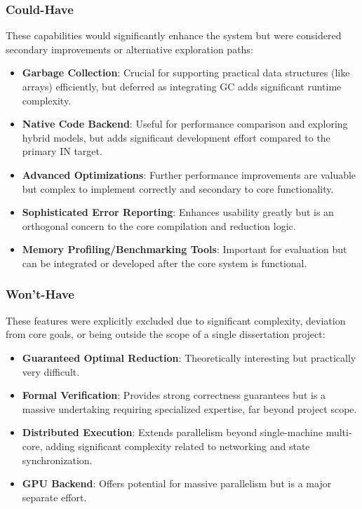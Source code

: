 \subsubsection*{Could-Have}
These capabilities would significantly enhance the system but were considered secondary improvements or alternative exploration paths:
\begin{itemize}
    \item \textbf{Garbage Collection}: Crucial for supporting practical data structures (like arrays) efficiently, but deferred as integrating GC adds significant runtime complexity.
    \item \textbf{Native Code Backend}: Useful for performance comparison and exploring hybrid models, but adds significant development effort compared to the primary IN target.
    \item \textbf{Advanced Optimizations}: Further performance improvements are valuable but complex to implement correctly and secondary to core functionality.
    \item \textbf{Sophisticated Error Reporting}: Enhances usability greatly but is an orthogonal concern to the core compilation and reduction logic.
    \item \textbf{Memory Profiling/Benchmarking Tools}: Important for evaluation but can be integrated or developed after the core system is functional.
\end{itemize}

\subsubsection*{Won't-Have}
These features were explicitly excluded due to significant complexity, deviation from core goals, or being outside the scope of a single dissertation project:
\begin{itemize}
    \item \textbf{Guaranteed Optimal Reduction}: Theoretically interesting but practically very difficult.
    \item \textbf{Formal Verification}: Provides strong correctness guarantees but is a massive undertaking requiring specialized expertise, far beyond project scope.
    \item \textbf{Distributed Execution}: Extends parallelism beyond single-machine multi-core, adding significant complexity related to networking and state synchronization.
    \item \textbf{GPU Backend}: Offers potential for massive parallelism but is a major separate effort.
\end{itemize}


